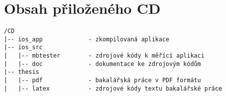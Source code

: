 \chapter{Obsah přiloženého CD}
\begin{verbatim}
/CD
|-- ios_app             - zkompilovaná aplikace
|-- ios_src    
|   |-- mbtester        - zdrojové kódy k měřící aplikaci
|   |-- doc             - dokumentace ke zdrojovým kódům           
|-- thesis
|   |-- pdf             - bakalářská práce v PDF formátu
|   |-- latex           - zdrojové kódy textu bakalářské práce
\end{verbatim}